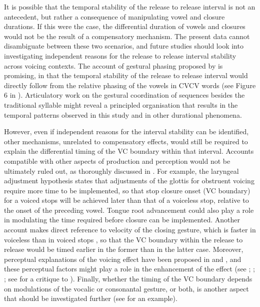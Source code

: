 \documentclass[charis]{glossa}
\begin{document}
It is possible that the temporal stability of the release to release
interval is not an antecedent, but rather a consequence of manipulating
vowel and closure durations. If this were the case, the differential
duration of vowels and closures would not be the result of a
compensatory mechanism. The present data cannot disambiguate between
these two scenarios, and future studies should look into investigating
independent reasons for the release to release interval stability across
voicing contexts. The account of gestural phasing proposed by
\citet{tilsen2013, tilsen2016} is promising, in that the temporal
stability of the release to release interval would directly follow from
the relative phasing of the vowels in CVCV words (see Figure 6 in
\citealt{tilsen2013}). Articulatory work on the gestural coordination of
sequences besides the traditional syllable might reveal a principled
organisation that results in the temporal patterns observed in this
study and in other durational phenomena.

However, even if independent reasons for the interval stability can be
identified, other mechanisms, unrelated to compensatory effects, would
still be required to explain the differential timing of the VC boundary
within that interval. Accounts compatible with other aspects of
production and perception would not be ultimately ruled out, as
thoroughly discussed in \citet{begus2017}. For example, the laryngeal
adjustment hypothesis \citep{halle1967a} states that adjustments of the
glottis for obstruent voicing require more time to be implemented, so
that stop closure onset (VC boundary) for a voiced stops will be
achieved later than that of a voiceless stop, relative to the onset of
the preceding vowel. Tongue root advancement
\citep{rothenberg1967, westbury1983, ohala2011} could also play a role
in modulating the time required before closure can be implemented.
Another account \citep{chen1970} makes direct reference to velocity of
the closing gesture, which is faster in voiceless than in voiced stops
\citep{van-summers1987, de-jong1991}, so that the VC boundary within the
release to release would be timed earlier in the former than in the
latter case. Moreover, perceptual explanations of the voicing effect
have been proposed in \citet{javkin1976} and \citet{kluender1988}, and
these perceptual factors might play a role in the enhancement of the
effect (see \citealt{port1982}; \citealt{luce1985};
\citealt{kingston1994}; see \citealt{fowler1992} for a critique to
\citealt{kluender1988}). Finally, whether the timing of the VC boundary
depends on modulations of the vocalic or consonantal gesture, or both,
is another aspect that should be investigated further (see
\citealt{de-jong1991} for an example).
\end{document}
